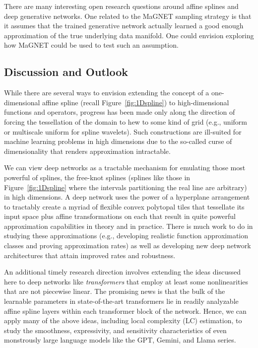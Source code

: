 \documentclass{notices}
\begin{document}

There are many interesting open research questions around affine splines and deep generative networks. One related to the  MaGNET sampling strategy is that it assumes that the trained generative network actually learned a good enough approximation of the true underlying data manifold. 
One could envision exploring how MaGNET could be used to test such an assumption. 



\subsection*{Discussion and Outlook}


While there are several ways to envision extending the concept of a one-dimensional affine spline (recall Figure~\ref{fig:1Dspline}) to high-dimensional functions and operators, progress has been made only along the direction of forcing the tessellation of the domain to hew to some kind of grid (e.g., uniform or multiscale uniform for spline wavelets).
Such constructions are ill-suited for machine learning problems in high dimensions due to the so-called curse of dimensionality that renders approximation intractable.


We can view deep networks as a tractable mechanism for emulating those most powerful of splines, the free-knot splines (splines like those in Figure~\ref{fig:1Dspline} where the intervals partitioning the real line are arbitrary) in high dimensions.
A deep network uses the power of a hyperplane arrangement to tractably create a myriad of flexible convex polytopal tiles that tessellate its input space plus affine transformations on each that result in quite powerful approximation capabilities in theory \cite{devore2021neural} and in practice.
There is much work to do in studying these approximations (e.g., developing realistic function approximation classes and proving approximation rates) as well as developing new deep network architectures that attain improved rates and robustness.


An additional timely research direction involves extending the ideas discussed here to deep networks like {\em transformers} that employ at least some nonlinearities that are not piecewise linear.
The promising news is that the bulk of the learnable parameters in state-of-the-art transformers lie in readily analyzable affine spline layers within each transformer block of the network.
Hence, we can apply many of the above ideas, including local complexity (LC) estimation, to study the smoothness, expressivity, and sensitivity characteristics of even monstrously large language models like the GPT, Gemini, and Llama series.
\end{document}
